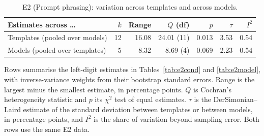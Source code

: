 \begin{table}[t]
\centering
\caption{E2 (Prompt phrasing): variation across templates and across models.}
\label{tab:e2het}
\small
\begin{tabular}{lrrrrrr}
\toprule
Estimates across \dots & $k$ & Range & $Q$ (df) & $p$ & $\tau$ & $I^2$ \\
\midrule
Templates (pooled over models) & 12 & 16.08 & 24.01 (11) & 0.013 & 3.53 & 0.54 \\
Models (pooled over templates) & 5 & 8.32 & 8.69 (4) & 0.069 & 2.23 & 0.54 \\
\bottomrule
\end{tabular}
\vspace{2pt}
\parbox{\linewidth}{\footnotesize Rows summarise the left-digit estimates in Tables~\ref{tab:e2cond} and \ref{tab:e2model}, with inverse-variance weights from their bootstrap standard errors. Range is the largest minus the smallest estimate, in percentage points. $Q$ is Cochran's heterogeneity statistic and $p$ its $\chi^2$ test of equal estimates. $\tau$ is the DerSimonian--Laird estimate of the standard deviation between templates or between models, in percentage points, and $I^2$ is the share of variation beyond sampling error. Both rows use the same E2 data.}
\end{table}
